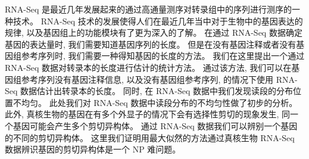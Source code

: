 
\secretlevel{} \secretyear{}

\makeatletter
\ifthu@bachelor\relax\else
  \ifthu@doctor
  \else
    \ifthu@master
    \fi
  \fi
\fi
\makeatother





\begin{cabstract}
	RNA-Seq 是最近几年发展起来的通过高通量测序对转录组中的序列进行测序的一种技术。 
	RNA-Seq 技术的发展使得人们在最近几年当中对于生物中的基因表达的规律, 
	以及基因组上的功能模块有了更为深入的了解。 
	在通过 RNA-Seq 数据确定基因的表达量时, 我们需要知道基因序列的长度。 
	但是在没有基因注释或者没有基因组参考序列时, 我们需要一种得知基因的长度的方法。
	我们在这里提出一个通过 RNA-Seq 数据对转录本的长度进行估计的统计方法。 
	通过该方法, 我们可以在基因组参考序列没有基因注释信息, 以及没有基因组参考序列, 
	的情况下使用 RNA-Seq 数据估计出转录本的长度。
	同时, 在 RNA-Seq 数据中我们发现读段的分布位置不均匀。
	此处我们对 RNA-Seq 数据中读段分布的不均匀性做了初步的分析。
	此外, 真核生物的基因在有多个外显子的情况下会有选择性剪切的现象发生, 
	同一个基因可能会产生多个剪切异构体。
	通过 RNA-Seq 数据我们可以辨别一个基因的不同的剪切异构体。
	这里我们证明用最大似然的方法通过真核生物 RNA-Seq 数据辨识基因的剪切异构体是一个 NP 难问题。
\end{cabstract}

